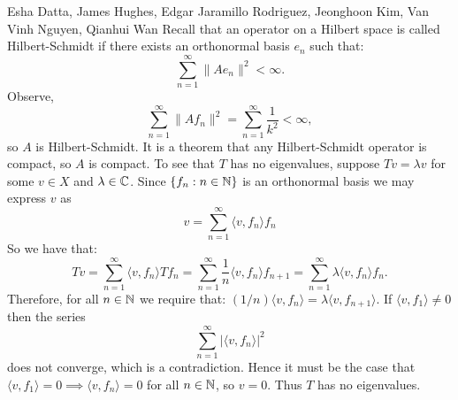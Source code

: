 

\begin{solution}{Esha Datta, James Hughes, Edgar Jaramillo Rodriguez, Jeonghoon Kim, Van Vinh Nguyen, Qianhui Wan}
        Recall that an operator on a Hilbert space is called Hilbert-Schmidt if there exists an orthonormal basis $e_n$ such that:
        \begin{equation*}
            \sum_{n=1}^\infty \lVert Ae_n \rVert^2 < \infty.
        \end{equation*}
        Observe, 
        \begin{equation*}
            \sum_{n=1}^\infty \lVert Af_n \rVert^2 = 
            \sum_{n=1}^\infty \frac{1}{k^2} < \infty,
        \end{equation*}
        so $A$ is Hilbert-Schmidt.
        It is a theorem that any Hilbert-Schmidt operator is compact, so $A$ is compact.
        To see that $T$ has no eigenvalues, suppose $Tv = \lambda v$ for some $v\in X$ and $\lambda \in \mathbb{C}$.
        Since $\{f_n: n\in\mathbb{N}\}$ is an orthonormal basis we may express $v$ as 
        \begin{equation*}
            v = \sum_{n=1}^\infty \langle v, f_n\rangle f_n
        \end{equation*}
        So we have that:
        \begin{equation*}
            Tv = \sum_{n=1}^\infty \langle v, f_n\rangle Tf_n = \sum_{n=1}^\infty \frac{1}{n} \langle v, f_n\rangle f_{n+1} = \sum_{n=1}^\infty \lambda \langle v, f_n\rangle f_n.
        \end{equation*}
        Therefore, for all $n\in \mathbb{N}$ we require that: $(1/n)\langle v, f_n\rangle = \lambda \langle v, f_{n+1} \rangle$.
        If $\langle v , f_1 \rangle \neq 0$ then the series
        \begin{equation*}
            \sum_{n=1}^\infty |\langle v,f_n\rangle|^2 
        \end{equation*}
        does not converge, which is a contradiction.
        Hence it must be the case that $\langle v , f_1 \rangle = 0 \implies \langle v , f_n \rangle = 0$ for all $n\in\mathbb{N}$, so $v=0$.
        Thus $T$ has no eigenvalues.
\end{solution}

